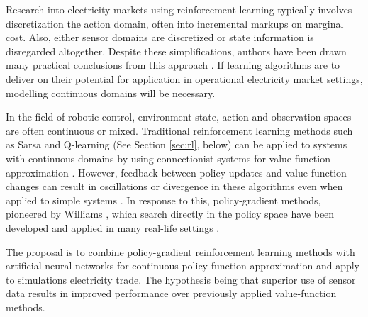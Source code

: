 Research into electricity markets using reinforcement learning typically
involves discretization the action domain, often into incremental markups
on marginal cost. Also, either sensor domains are discretized or state
information is disregarded altogether.  Despite these simplifications, authors
have been drawn many practical conclusions from this approach \cite{anke:2008}.
If learning algorithms are to deliver on their potential for application in
operational electricity market settings, modelling continuous domains will be
necessary.

In the field of robotic control, environment state, action and observation
spaces are often continuous or mixed.
Traditional reinforcement learning methods such as Sarsa and Q-learning (See
Section \ref{sec:rl}, below) can be applied to systems with continuous domains
by using connectionist systems for value function approximation
\cite{barto:neuron}. However, feedback between policy updates and value
function changes can result in oscillations or divergence in these algorithms
even when applied to simple systems \cite{peters:enac}.  In response to this,
policy-gradient methods, pioneered by Williams \cite{williams:reinforce}, which
search directly in the policy space have been developed and applied in many
real-life settings
\cite{barto:policy,shaal:robots,moody:direct,peshkin:routing}.

The proposal is to combine policy-gradient reinforcement learning methods with
artificial neural networks for continuous policy function approximation and
apply to simulations electricity trade.  The hypothesis being that superior use
of sensor data results in improved performance over previously applied
value-function methods.



